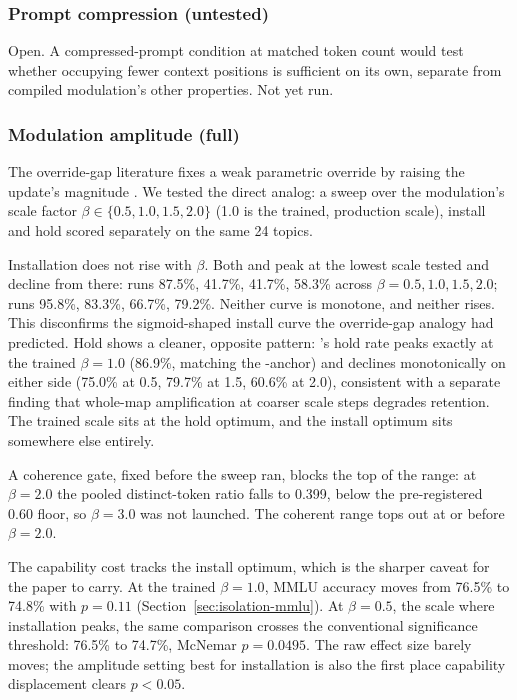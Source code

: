 \subsubsection{Prompt compression (untested)}

Open. A compressed-prompt condition at matched token count would test whether occupying
fewer context positions is sufficient on its own, separate from compiled modulation's
other properties. Not yet run.

\subsubsection{Modulation amplitude (full)}
\label{app:isolation-amplitude-full}

The override-gap literature fixes a weak parametric override by raising the update's
magnitude \citep{cheng2026overridegap}. We tested the direct analog: a sweep over the
modulation's scale factor \(\beta \in \{0.5, 1.0, 1.5, 2.0\}\) (1.0 is the trained,
production scale), install and hold scored separately on the same 24 topics.

Installation does not rise with \(\beta\). Both \condC{} and \condF{}
peak at the lowest scale tested and decline from there: \condC{} runs 87.5\%, 41.7\%,
41.7\%, 58.3\% across \(\beta = 0.5, 1.0, 1.5, 2.0\); \condF{} runs 95.8\%, 83.3\%,
66.7\%, 79.2\%. Neither curve is monotone, and neither rises. This disconfirms the
sigmoid-shaped install curve the override-gap analogy had predicted. Hold shows a
cleaner, opposite pattern: \condF{}'s hold rate peaks exactly at the trained \(\beta =
1.0\) (86.9\%, matching the \condF{}-anchor) and declines monotonically on either side
(75.0\% at 0.5, 79.7\% at 1.5, 60.6\% at 2.0), consistent with a separate finding that
whole-map amplification at coarser scale steps degrades retention. The trained scale
sits at the hold optimum, and the install optimum sits somewhere else entirely.

A coherence gate, fixed before the sweep ran, blocks the top of the range: at
\(\beta = 2.0\) the pooled distinct-token ratio falls to 0.399, below the pre-registered
0.60 floor, so \(\beta = 3.0\) was not launched. The coherent range tops out at or
before \(\beta = 2.0\).

The capability cost tracks the install optimum, which is the sharper caveat for the
paper to carry. At the trained \(\beta = 1.0\), MMLU accuracy moves from 76.5\% to
74.8\% with \(p = 0.11\) (Section~\ref{sec:isolation-mmlu}). At
\(\beta = 0.5\), the scale where installation peaks, the same comparison crosses the
conventional significance threshold: 76.5\% to 74.7\%, McNemar \(p = 0.0495\). The raw
effect size barely moves; the amplitude setting best for installation is also the first
place capability displacement clears \(p < 0.05\).

